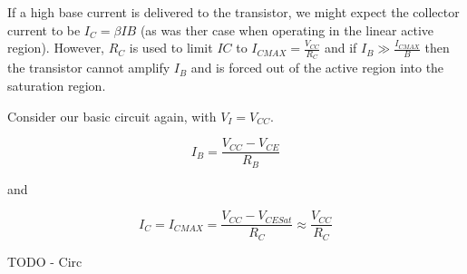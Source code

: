 \documentclass[a4paper,12pt]{article}
\begin{document}
If a high base current is delivered to the transistor, we
might expect the collector current to be $I_{C} = \beta I B$ (as was
ther case when operating in the linear active region). However, $R_{C}$
is used to limit $IC$ to $I_{C MAX} = \frac{V_{CC}}{R_{C}}$ and if
$I_{B} \gg \frac{I_{C MAX}}{B}$ then the transistor cannot amplify
$I_{B}$ and is forced out of the active region into the saturation
region.

Consider our basic circuit again, with $V_{I} = V_{CC}$.

\[ I_{B} = \frac{V_{CC} - V_{CE}}{R_{B}} \]

and

\[ I_{C} = I_{C MAX} = \frac{V_{CC} - V_{CE Sat}}{R_{C}} \approx
\frac{V_{CC}}{R_{C}} \]

\begin{table}[hbtp]

TODO - Circ

\end{table}
\end{document}
